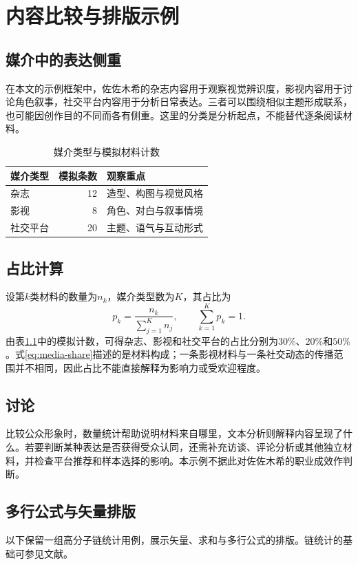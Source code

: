 \chapter{内容比较与排版示例}
\section{媒介中的表达侧重}
在本文的示例框架中，佐佐木希的杂志内容用于观察视觉辨识度，影视内容用于讨论角色叙事，社交平台内容用于分析日常表达。三者可以围绕相似主题形成联系，也可能因创作目的不同而各有侧重。这里的分类是分析起点，不能替代逐条阅读材料。

\begin{table}[htbp]
  \centering
  \caption{媒介类型与模拟材料计数}
  \label{tab:media-counts}
  \begin{tabular}{lrl}
    \toprule
    媒介类型 & 模拟条数 & 观察重点\\
    \midrule
    杂志 & 12 & 造型、构图与视觉风格\\
    影视 & 8 & 角色、对白与叙事情境\\
    社交平台 & 20 & 主题、语气与互动形式\\
    \bottomrule
  \end{tabular}
\end{table}

\section{占比计算}
设第$k$类材料的数量为$n_k$，媒介类型数为$K$，其占比为
\begin{equation}
  p_k=\frac{n_k}{\sum_{j=1}^{K}n_j},\qquad \sum_{k=1}^{K}p_k=1.
  \label{eq:media-share}
\end{equation}
由表\ref{tab:media-counts}中的模拟计数，可得杂志、影视和社交平台的占比分别为$30\%$、$20\%$和$50\%$。式\eqref{eq:media-share}描述的是材料构成；一条影视材料与一条社交动态的传播范围并不相同，因此占比不能直接解释为影响力或受欢迎程度。

\section{讨论}
比较公众形象时，数量统计帮助说明材料来自哪里，文本分析则解释内容呈现了什么。若要判断某种表达是否获得受众认同，还需补充访谈、评论分析或其他独立材料，并检查平台推荐和样本选择的影响。本示例不据此对佐佐木希的职业成效作判断。

\section{多行公式与矢量排版}
以下保留一组高分子链统计用例，展示矢量、求和与多行公式的排版。链统计的基础可参见文献\cite{flory1953}。
